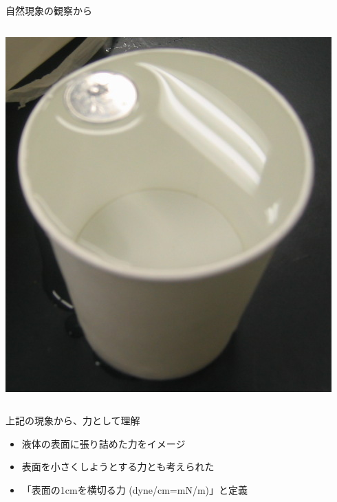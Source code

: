 \documentclass[unicode,12pt]{beamer}%
\begin{document}
\begin{frame}
\begin{block}{自然現象の観察から}
\begin{columns}[c, onlytextwidth]
			\centering
			\includegraphics[width=.41\textwidth]{hyoumen_1.png}
		\end{columns}
	\end{block}

	\begin{exampleblock}{上記の現象から、力として理解}
		\begin{itemize}
			\item 液体の表面に張り詰めた力をイメージ
			\item 表面を小さくしようとする力とも考えられた
			\item 「表面の1cmを横切る力 (dyne/cm=mN/m)」と定義
		\end{itemize}
	\end{exampleblock}
\end{frame}
\end{document}
